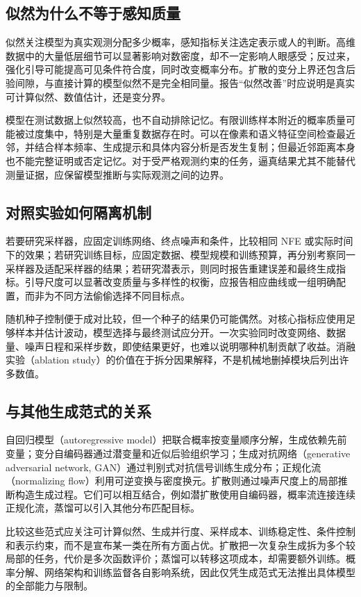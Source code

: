 \documentclass[UTF8,12pt,a4paper,fontset=fandol]{ctexart}
\begin{document}
\subsection{似然为什么不等于感知质量}
似然关注模型为真实观测分配多少概率，感知指标关注选定表示或人的判断。高维数据中的大量低层细节可以显著影响对数密度，却不一定影响人眼感受；反过来，强化引导可能提高可见条件符合度，同时改变概率分布。扩散的变分上界还包含后验间隙，与直接计算的模型似然不是完全相同量。报告“似然改善”时应说明是真实可计算似然、数值估计，还是变分界。

模型在测试数据上似然较高，也不自动排除记忆。有限训练样本附近的概率质量可能被过度集中，特别是大量重复数据存在时。可以在像素和语义特征空间检查最近邻，并结合样本频率、生成提示和具体内容分析是否发生复制；但最近邻距离本身也不能完整证明或否定记忆。对于受严格观测约束的任务，逼真结果尤其不能替代测量证据，应保留模型推断与实际观测之间的边界。

\subsection{对照实验如何隔离机制}
若要研究采样器，应固定训练网络、终点噪声和条件，比较相同 NFE 或实际时间下的效果；若研究训练目标，应固定数据、模型规模和训练预算，再分别考察同一采样器及适配采样器的结果；若研究潜表示，则同时报告重建误差和最终生成指标。引导尺度可以显著改变质量与多样性的权衡，应报告相应曲线或一组明确配置，而非为不同方法偷偷选择不同目标点。

随机种子控制便于成对比较，但一个种子的结果仍可能偶然。对核心指标应使用足够样本并估计波动，模型选择与最终测试应分开。一次实验同时改变网络、数据量、噪声日程和采样步数，即使结果更好，也难以说明哪种机制贡献了收益。消融实验（ablation study）的价值在于拆分因果解释，不是机械地删掉模块后列出许多数值。

\subsection{与其他生成范式的关系}
自回归模型（autoregressive model）把联合概率按变量顺序分解，生成依赖先前变量；变分自编码器通过潜变量和近似后验组织学习；生成对抗网络（generative adversarial network, GAN）通过判别式对抗信号训练生成分布；正规化流（normalizing flow）利用可逆变换与密度换元。扩散则通过噪声尺度上的局部推断构造生成过程。它们可以相互结合，例如潜扩散使用自编码器，概率流连接连续正规化流，蒸馏可以引入其他分布匹配目标。

比较这些范式应关注可计算似然、生成并行度、采样成本、训练稳定性、条件控制和表示约束，而不是宣布某一类在所有方面占优。扩散把一次复杂生成拆为多个较局部的任务，代价是多次函数评价；蒸馏可以转移这项成本，却需要额外训练。概率分解、网络架构和训练监督各自影响系统，因此仅凭生成范式无法推出具体模型的全部能力与限制。
\end{document}
